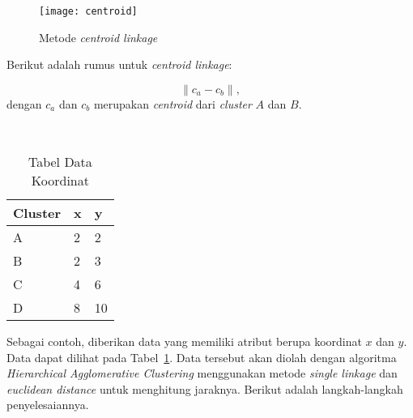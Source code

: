 \begin{itemize}
\begin{figure}[H]
    \centering  
    \texttt{[image: centroid]}  
    \caption[Metode {\it centroid linkage} ]{Metode {\it centroid linkage}} 
    \label{fig:centroid} 
\end{figure}

Berikut adalah rumus untuk \textit{centroid linkage}:

$$
\| c_{a} - c_{b} \|, 
$$
dengan $c_{a}$ dan $c_{b}$ merupakan \textit{centroid} dari \textit{cluster} $A$ dan $B$.\\


\end{itemize}
\
\begin{table}[H] 
	\centering 
	\caption{Tabel Data Koordinat}
	\label{tab:data}
	\begin{tabular}{|p{1.5cm}|p{1cm}|p{1cm}|}

\hline
 Cluster & x & y \\
\hline
A & 2 & 2 \\
\hline
B & 2 & 3 \\
\hline
C & 4 & 6 \\
\hline
D & 8 & 10 \\
\hline

	\end{tabular} 
\end{table}

Sebagai contoh, diberikan data yang memiliki atribut berupa koordinat $x$ dan $y$. Data dapat dilihat pada Tabel~\ref{tab:data}. Data tersebut akan diolah dengan algoritma \textit{Hierarchical Agglomerative Clustering} menggunakan metode \textit{single linkage} dan \textit{euclidean distance} untuk menghitung jaraknya. Berikut adalah langkah-langkah penyelesaiannya.



